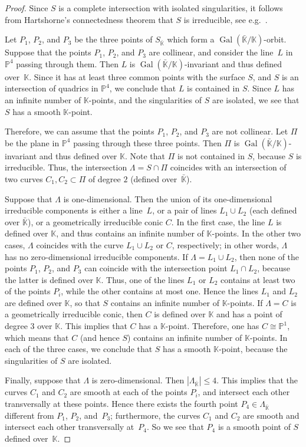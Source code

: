 \documentclass[12pt]{amsart}
\theoremstyle{definition}
\theoremstyle{remark}
\newcommand{\PP}{\mathbb{P}}
\newcommand{\KK}{\mathbb{K}}
\newcommand{\Gal}{\operatorname{Gal}}
\def \le {\leqslant}
\begin{document}
\begin{proof}
Since $S$ is a complete intersection with isolated singularities, it follows
from Hartshorne's connectedness theorem that
$S$ is irreducible, see e.g.~\mbox{\cite[Theorem~18.12]{Eisenbud}}.

Let $P_1$, $P_2$, and $P_3$ be the three points of $S_{\bar{\KK}}$ which form a $\Gal(\bar{\KK}/\KK)$-orbit.
Suppose that the points $P_1$, $P_2$, and $P_3$ are collinear, and
consider the line~$L$
in~$\PP^4$ passing through them. Then $L$
is $\Gal(\bar{\KK}/\KK)$-invariant and thus defined over~$\KK$.
Since it has at least three common points with the surface $S$,
and $S$ is an intersection of quadrics in $\PP^4$,
we conclude that $L$ is contained in $S$.
Since $L$ has an infinite number of $\KK$-points, and the singularities of $S$
are isolated, we see that $S$ has a smooth $\KK$-point.

Therefore, we can assume that the points $P_1$, $P_2$, and $P_3$ are not collinear.
Let $\Pi$ be the plane in $\PP^4$ passing through
these three points. Then $\Pi$
is $\Gal(\bar{\KK}/\KK)$-invariant and thus defined over $\KK$.
Note that $\Pi$ is not contained in $S$, because $S$ is irreducible.
Thus, the intersection $\Lambda=S\cap\Pi$ coincides with an intersection of two curves $C_1, C_2\subset \Pi$
of degree $2$ (defined over~$\bar{\KK}$).

Suppose that $\Lambda$ is one-dimensional.
Then the union of its one-dimensional irreducible components is either a line~$L$,
or a pair of lines $L_1\cup L_2$ (each defined over $\bar{\KK}$),
or a geometrically irreducible conic $C$.
In the first case, the line $L$
is defined over $\KK$, and thus contains
an infinite number of $\KK$-points.
In the other two cases, $\Lambda$ coincides with the curve $L_1\cup L_2$ or $C$, respectively;
in other words, $\Lambda$ has no zero-dimensional irreducible components.
If $\Lambda=L_1\cup L_2$, then none of the points $P_1$, $P_2$, and $P_3$
can coincide with the intersection point $L_1\cap L_2$, because the latter is defined over $\KK$.
Thus, one of the lines $L_1$ or $L_2$ contains at least two of the points $P_i$, while the other
contains at most one. Hence the lines $L_1$ and $L_2$ are defined over $\KK$,
so that $S$ contains an infinite number of $\KK$-points.
If $\Lambda=C$ is a geometrically irreducible conic, then $C$ is defined over $\KK$
and has a point of degree $3$ over $\KK$. This implies that $C$ has a $\KK$-point.
Therefore, one has $C\cong\PP^1$, which means that $C$ (and hence $S$) contains an infinite number of
$\KK$-points. In each of the three cases, we conclude that $S$ has a smooth $\KK$-point, because the
singularities of $S$ are isolated.


Finally, suppose that $\Lambda$ is zero-dimensional.
Then $|\Lambda_{\bar{\KK}}|\le 4$. This implies that the curves $C_1$ and $C_2$ are smooth
at each of the points $P_i$, and intersect each other transversally at these points. Hence
there exists the fourth point $P_4\in \Lambda_{\bar{\KK}}$ different from $P_1$, $P_2$, and~$P_3$; furthermore,
the curves $C_1$ and $C_2$ are smooth and
intersect each other transversally at~$P_4$. So we see that $P_4$ is a smooth point of $S$ defined over~$\KK$.
\end{proof}
\end{document}
